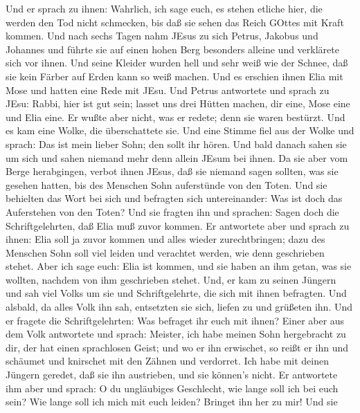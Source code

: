  Und er sprach zu ihnen: Wahrlich, ich sage euch, es stehen
etliche hier, die werden den Tod nicht schmecken, bis daß sie sehen das
Reich GOttes mit Kraft kommen.  Und nach sechs Tagen nahm
JEsus zu sich Petrus, Jakobus und Johannes und führte sie auf einen
hohen Berg besonders alleine und verklärete sich vor ihnen. 
Und seine Kleider wurden hell und sehr weiß wie der Schnee, daß sie kein
Färber auf Erden kann so weiß machen.  Und es erschien ihnen
Elia mit Mose und hatten eine Rede mit JEsu.  Und Petrus
antwortete und sprach zu JEsu: Rabbi, hier ist gut sein; lasset uns drei
Hütten machen, dir eine, Mose eine und Elia eine.  Er wußte
aber nicht, was er redete; denn sie waren bestürzt.  Und es
kam eine Wolke, die überschattete sie. Und eine Stimme fiel aus der
Wolke und sprach: Das ist mein lieber Sohn; den sollt ihr hören.
 Und bald danach sahen sie um sich und sahen niemand mehr
denn allein JEsum bei ihnen.  Da sie aber vom Berge
herabgingen, verbot ihnen JEsus, daß sie niemand sagen sollten, was sie
gesehen hatten, bis des Menschen Sohn auferstünde von den Toten.
 Und sie behielten das Wort bei sich und befragten sich
untereinander: Was ist doch das Auferstehen von den Toten? 
Und sie fragten ihn und sprachen: Sagen doch die Schriftgelehrten, daß
Elia muß zuvor kommen.  Er antwortete aber und sprach zu
ihnen: Elia soll ja zuvor kommen und alles wieder zurechtbringen; dazu
des Menschen Sohn soll viel leiden und verachtet werden, wie denn
geschrieben stehet.  Aber ich sage euch: Elia ist kommen,
und sie haben an ihm getan, was sie wollten, nachdem von ihm geschrieben
stehet.  Und, er kam zu seinen Jüngern und sah viel Volks
um sie und Schriftgelehrte, die sich mit ihnen befragten. 
Und alsbald, da alles Volk ihn sah, entsetzten sie sich, liefen zu und
grüßeten ihn.  Und er fragete die Schriftgelehrten: Was
befraget ihr euch mit ihnen?  Einer aber aus dem Volk
antwortete und sprach: Meister, ich habe meinen Sohn hergebracht zu dir,
der hat einen sprachlosen Geist;  und wo er ihn erwischet,
so reißt er ihn und schäumet und knirschet mit den Zähnen und verdorret.
Ich habe mit deinen Jüngern geredet, daß sie ihn austrieben, und sie
können's nicht.  Er antwortete ihm aber und sprach: O du
ungläubiges Geschlecht, wie lange soll ich bei euch sein? Wie lange soll
ich mich mit euch leiden? Bringet ihn her zu mir!  Und sie
